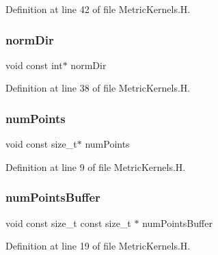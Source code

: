 Definition at line 42 of file Metric\+Kernels.\+H.

\hypertarget{MetricKernels_8H_ae36835d84fb8e5e32a81e1f1f6c0a69d}{}\label{MetricKernels_8H_ae36835d84fb8e5e32a81e1f1f6c0a69d} 
\subsubsection{\texorpdfstring{norm\+Dir}{normDir}}
{\footnotesize\ttfamily void const int$\ast$ norm\+Dir}



Definition at line 38 of file Metric\+Kernels.\+H.

\hypertarget{MetricKernels_8H_ab847e17018c49a895984dc0c0ce0c2c9}{}\label{MetricKernels_8H_ab847e17018c49a895984dc0c0ce0c2c9} 
\subsubsection{\texorpdfstring{num\+Points}{numPoints}}
{\footnotesize\ttfamily void const size\+\_\+t$\ast$ num\+Points}



Definition at line 9 of file Metric\+Kernels.\+H.

\hypertarget{MetricKernels_8H_a091c49fcdc8b19150902448c3c284be2}{}\label{MetricKernels_8H_a091c49fcdc8b19150902448c3c284be2} 
\subsubsection{\texorpdfstring{num\+Points\+Buffer}{numPointsBuffer}}
{\footnotesize\ttfamily void const size\+\_\+t const size\+\_\+t $\ast$ num\+Points\+Buffer}



Definition at line 19 of file Metric\+Kernels.\+H.

\hypertarget{MetricKernels_8H_ad3376da8cc0376fa774bdc40b28a61ca}{}\label{MetricKernels_8H_ad3376da8cc0376fa774bdc40b28a61ca} 
